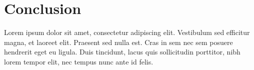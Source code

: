 \chapter{Conclusion}
\label{sec:conclusion}

Lorem ipsum dolor sit amet, consectetur adipiscing elit. Vestibulum sed efficitur magna, et laoreet elit. Praesent sed nulla est. Cras in sem nec sem posuere hendrerit eget eu ligula. Duis tincidunt, lacus quis sollicitudin porttitor, nibh lorem tempor elit, nec tempus nunc ante id felis.

\cleardoublepage